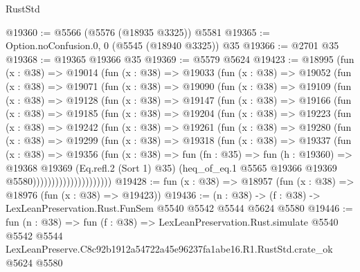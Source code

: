 \begin{lexlean}{RustStd}
\begin{coremodule}
@19360 := @5566 (@5576 (@18935 @3325)) @5581
@19365 := Option.noConfusion.{0, 0} (@5545 (@18940 @3325)) @35
@19366 := @2701 @35
@19368 := @19365 @19366 @35
@19369 := @5579 @5624
@19423 := @18995
    (fun (x : @38) =>
    @19014
      (fun (x : @38) =>
      @19033
        (fun (x : @38) =>
        @19052
          (fun (x : @38) =>
          @19071
            (fun (x : @38) =>
            @19090
              (fun (x : @38) =>
              @19109
                (fun (x : @38) =>
                @19128
                  (fun (x : @38) =>
                  @19147
                    (fun (x : @38) =>
                    @19166
                      (fun (x : @38) =>
                      @19185
                        (fun (x : @38) =>
                        @19204
                          (fun (x : @38) =>
                          @19223
                            (fun (x : @38) =>
                            @19242
                              (fun (x : @38) =>
                              @19261
                                (fun (x : @38) =>
                                @19280
                                  (fun (x : @38) =>
                                  @19299
                                    (fun (x : @38) =>
                                    @19318
                                      (fun (x : @38) =>
                                      @19337
                                        (fun (x : @38) =>
                                        @19356
                                          (fun (x : @38) =>
                                          fun (fn : @35) =>
                                          fun (h : @19360) =>
                                          @19368
                                            @19369
                                            (Eq.refl.{2} (Sort 1) @35)
                                            (heq_of_eq.{1}
                                              @5565
                                              @19366
                                              @19369
                                              @5580)))))))))))))))))))))
@19428 := fun (x : @38) => @18957 (fun (x : @38) => @18976 (fun (x : @38) => @19423))
@19436 := (n : @38) -> (f : @38) -> LexLeanPreservation.Rust.FunSem @5540 @5542 @5544 @5624 @5580
@19446 := fun (n : @38) =>
  fun (f : @38) =>
  LexLeanPreservation.Rust.simulate
    @5540
    @5542
    @5544
    LexLeanPreserve.C8c92b1912a54722a45e96237fa1abe16.R1.RustStd.crate_ok
    @5624
    @5580
\end{coremodule}
\end{lexlean}
